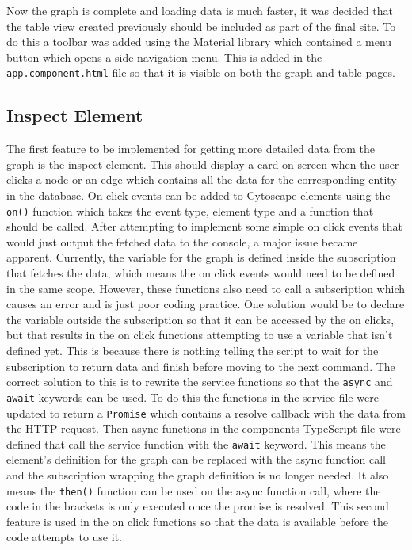 Now the graph is complete and loading data is much faster, it was decided that the table view created previously should be included as part of the final site. 
To do this a toolbar was added using the Material library which contained a menu button which opens a side navigation menu. This is added in the \verb|app.component.html| file so that it 
is visible on both the graph and table pages.
\subsection{Inspect Element}
The first feature to be implemented for getting more detailed data from the graph is the inspect element. This should display 
a card on screen when the user clicks a node or an edge which contains all the data for the corresponding entity in the database. 
On click events can be added to Cytoscape elements using the \verb|on()| function which takes the event type, element type and a function that should be called. 
After attempting to implement some simple on click events that would just output the fetched data to the console, a major issue became apparent.
Currently, the variable for the graph is defined inside the subscription that fetches the data, which means the on click events would need to be 
defined in the same scope. However, these functions also need to call a subscription which causes an error and is just poor coding practice. One solution 
would be to declare the variable outside the subscription so that it can be accessed by the on clicks, but that results in the on click 
functions attempting to use a variable that isn't defined yet. This is because there is nothing telling the script to wait for the 
subscription to return data and finish before moving to the next command. The correct solution to this is to rewrite the service functions so that 
the \verb|async| and \verb|await| keywords can be used. To do this the functions in the service file were updated to return a \verb|Promise| which contains a resolve 
callback with the data from the HTTP request. Then async functions in the components TypeScript file were defined that call the service function 
with the \verb|await| keyword. This means the element's definition for the graph can be replaced with the async function call 
and the subscription wrapping the graph definition is no longer needed. It also means the \verb|then()| function can be used on the async function call, 
where the code in the brackets is only executed once the promise is resolved. This second feature is used in the on click functions so that the data is available 
before the code attempts to use it.

